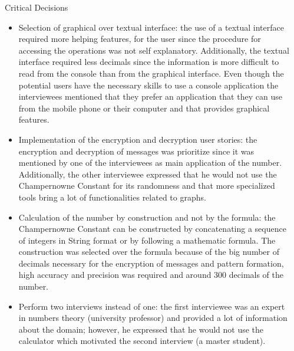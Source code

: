 \documentclass[final]{beamer}
\newlength{\sepwid}
\newlength{\onecolwid}
\begin{document}
\begin{frame}[t]
\begin{columns}[t]
\begin{column}{\onecolwid}
\begin{block}{Critical Decisions}
\begin{itemize}
\item Selection of graphical over textual interface: the use of a textual interface required more helping features, for the user since the procedure for accessing the operations was not self explanatory. Additionally, the textual interface required less decimals since the information is more difficult to read from the console than from the graphical interface. Even though the potential users have the necessary skills to use a console application the interviewees mentioned that they prefer an application that they can use from the mobile phone or their computer and that provides graphical features. \newline

\item Implementation of the encryption and decryption user stories: the encryption and decryption of messages was prioritize since it was mentioned by one of the interviewees as main application of the number. Additionally, the other interviewee expressed that he would not use the Champernowne Constant for its randomness and that more specialized tools bring a lot of functionalities related to graphs.\newline

\item Calculation of the number by construction and not by the formula: the Champernowne Constant can be constructed by concatenating a sequence of integers in String format or by following a mathematic formula. The construction was selected over the formula because of the big number of decimals necessary for the encryption of messages and pattern formation, high accuracy and precision was required and around 300 decimals of the number.\newline

\item Perform two interviews instead of one: the first interviewee was an expert in numbers theory (university professor) and provided a lot of information about the domain; however, he expressed that he would not use the calculator which motivated the second interview (a master student).

\end{itemize}


\end{block}

\end{column} %

\begin{column}{\sepwid}\end{column} %


\end{columns}
\end{frame}
\end{document}
